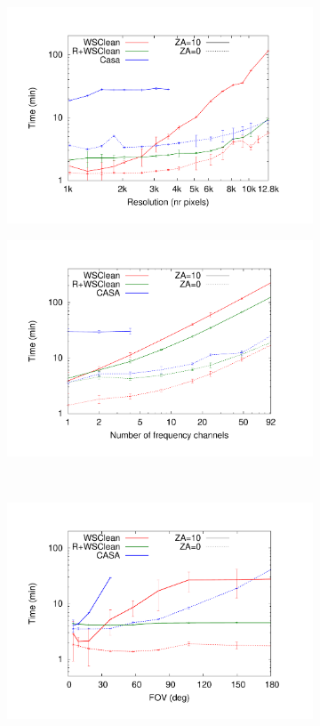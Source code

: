 \documentclass[useAMS,usenatbib]{mn2e}
\begin{document}
\begin{figure}
\begin{subfigure}{.5\linewidth}
\includegraphics[width=\linewidth]{img/benchmark-resolution/resolution}
\caption{}\label{fig:timing-resolution}%
\end{subfigure}%
\hspace{-.05\linewidth}\begin{subfigure}{.5\linewidth}%
\includegraphics[width=\linewidth]{img/benchmark-channels/channels}
\caption{}\label{fig:timing-channels}%
\end{subfigure}\\
\begin{subfigure}{.5\linewidth}%
\includegraphics[width=\linewidth]{img/benchmark-fov/fov}

\end{subfigure}
\end{figure}
\end{document}
